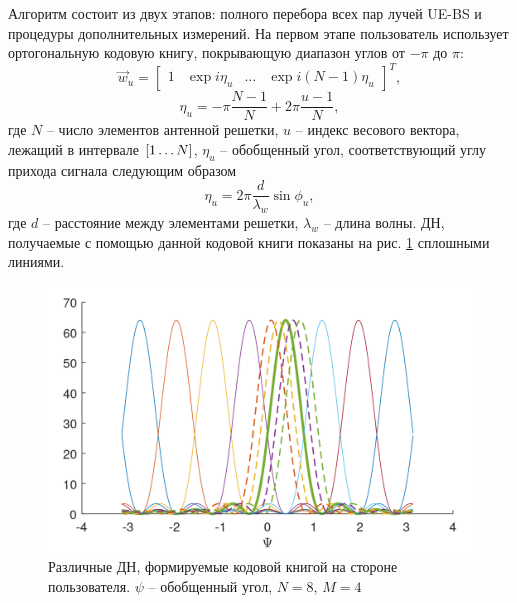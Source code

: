 Алгоритм состоит из двух этапов: полного перебора всех пар лучей UE-BS и
процедуры дополнительных измерений.
На первом этапе пользователь использует ортогональную кодовую книгу, покрывающую
диапазон углов от $-\pi$ до $\pi$:
\begin{equation}
    \label{eq:4.16}
    \vec w_u =
    \begin{bmatrix}
        1 & \exp {i \eta_u} & \dots & \exp{i(N-1)\eta_u}
    \end{bmatrix}^T,
\end{equation}
\begin{equation}
    \label{eq:4.17}
    \eta_u = -\pi \frac{N-1}{N} + 2\pi \frac{u-1}{N},
\end{equation}
где $N$ -- число элементов антенной решетки, $u$ -- индекс весового вектора, лежащий в интервале $\qty[1 \dots N]$, $\eta_u$ -- обобщенный угол, соответствующий углу прихода сигнала следующим образом
\begin{equation}
    \eta_u = 2\pi \frac{d}{\lambda_w}\sin\phi_u,
\end{equation}
где $d$ -- расстояние между элементами решетки, $\lambda_w$ -- длина волны. ДН,
получаемые с помощью данной кодовой книги показаны на рис. \ref{fig:4.9}
сплошными линиями.
\begin{figure}[ht]
    \centering
    \includegraphics[width=0.5\linewidth]{figs/fig4.8.png}
    \caption{Различные ДН, формируемые кодовой книгой на стороне пользователя. $\psi$ -- обобщенный угол, $N=8$, $M=4$}
    \label{fig:4.9}
\end{figure}

